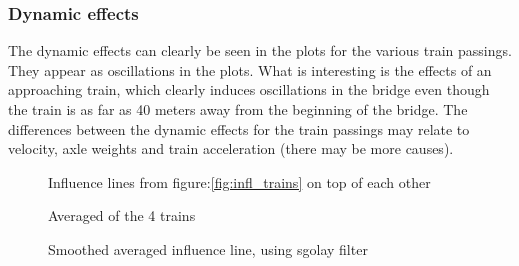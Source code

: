 \subsubsection{Dynamic effects}
The dynamic effects can clearly be seen in the plots for the various train passings. They appear as oscillations in the plots.
What is interesting is the effects of an approaching train, which clearly induces oscillations in the bridge even though the train is as far as 40 meters away from the beginning of the bridge. The differences between the dynamic effects for the train passings may relate to velocity, axle weights and train acceleration (there may be more causes).


\begin{figure}[H]
\centering

\caption{Influence lines from figure:\ref{fig:infl_trains} on top of each other}\label{fig:infl_all_trains}
\end{figure}

\begin{figure}[H]
\centering

\caption{Averaged of the 4 trains}
\label{fig:infl_averaged}
\end{figure}

% 

\begin{figure}[H]
\centering

\caption{Smoothed averaged influence line, using sgolay filter}
\label{fig:infl_averaged_smoothed}
\end{figure}
